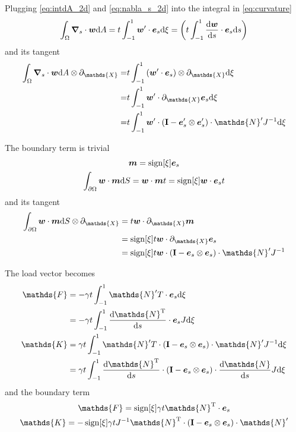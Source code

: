\documentclass[a4paper,11pt]{article}
\renewcommand{\to}[1]{\text{\boldmath $#1$}} %
\newcommand{\ts}[1]{\text{\boldmath $\mathrm{#1}$}} %
\newcommand{\uv}[1]{\mathds{#1}}
\newcommand{\um}[1]{\mathds{#1}}
\newcommand{\intd}[1]{\mathrm{d}#1}
\newcommand{\pderiv}[2]{\partial_{#2} #1}
\newcommand{\dderiv}[2]{\frac{\mathrm{d}#1}{\mathrm{d}#2}}
\newcommand{\T}{\mathrm{T}}
\DeclareMathOperator{\sign}{sign}
\begin{document}
Plugging \eqref{eq:intdA_2d} and \eqref{eq:nabla_s_2d} into the integral in \eqref{eq:curvature}
\begin{align}
 \int_\Omega\to \nabla_s\cdot\to w\intd A &= t \int_{-1}^{1} \to w'\cdot \to e_s \intd\xi = \left( t \int_{-1}^1 \dderiv{\to w}{s} \cdot \to e_s\intd s\right)\\
\end{align}
and its tangent
\begin{align}
 \int_\Omega\to \nabla_s\cdot\to w\intd A \otimes \pderiv{}{\uv X}
 =&t \int_{-1}^{1} \left(\to w'\cdot \to e_s\right)\otimes \pderiv{}{\uv X}  \intd\xi\\
 =&t \int_{-1}^{1} \to w'\cdot \pderiv{\to e_s}{\uv X} \intd\xi\\
 =&t \int_{-1}^{1} \to w'\cdot \left(\ts I-\to e_s'\otimes\to e_s' \right)\cdot \um N' J^{-1} \intd\xi
\end{align}

The boundary term is trivial
\begin{gather}
 \to m = \sign[\xi]\to e_s\\
 \int_{\partial\Omega} \to w\cdot \to m\intd S = \to w \cdot\to m t = \sign[\xi]\to w \cdot \to e_s t
\end{gather}
and its tangent
\begin{align}
 \int_{\partial\Omega} \to w\cdot \to m\intd S\otimes \pderiv{}{\uv X} &= t \to w\cdot\pderiv{\to m}{\uv X}\\
 &= \sign[\xi]t \to w\cdot\pderiv{\to e_s}{\uv X}\\
 &= \sign[\xi]t \to w\cdot \left(\ts I-\to e_s\otimes\to e_s\right)\cdot \um N' J^{-1}
\end{align}

The load vector becomes
\begin{align}
 \uv F &= -\gamma t \int_{-1}^{1} {\um N}'^\T\cdot \to e_s \intd\xi\\
       &= -\gamma t \int_{-1}^{1} \dderiv{{\um N}^\T}{s}\cdot \to e_s J \intd\xi \\
 \um K &= \gamma t \int_{-1}^{1} {\um N}'^\T\cdot \left(\ts I-\to e_s\otimes\to e_s\right)\cdot{\um N}' J^{-1} \intd\xi\\
       &=  \gamma t \int_{-1}^{1} \dderiv{\um N^\T}{s}\cdot \left(\ts I-\to e_s\otimes\to e_s\right)\cdot\dderiv{\um N}{s} J \intd\xi
\end{align}
and the boundary term
\begin{gather}
 \uv F = \sign[\xi]\gamma t {\um N}^\T\cdot\to e_s\\
 \um K = -\sign[\xi]\gamma t J^{-1} {\um N}^\T \cdot (\ts I - \to e_s\otimes \to e_s)\cdot {\um N}'
\end{gather}
\end{document}

